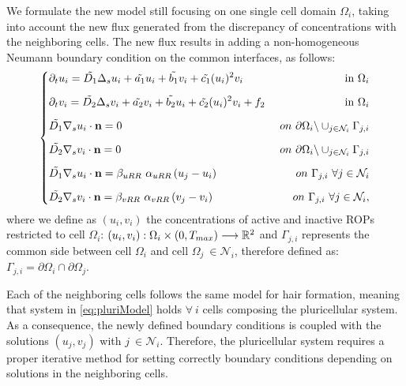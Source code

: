 \documentclass[a4paper]{siamart190516}
\begin{document}
We formulate the new model still focusing on one single cell domain $\Omega_i$, taking into account the new flux generated from the discrepancy of concentrations with the neighboring cells. The new flux results in adding a non-homogeneous Neumann boundary condition on the common interfaces, as follows:
\begin{equation} \label{eq:pluriModel}
\left\lbrace
\begin{matrix}
  \begin{aligned}
    & \partial_t u_i = \Tilde{D_1} \Delta_s u_i + \Tilde{a_1} u_i + \Tilde{b_1} v_i + \Tilde{c_1} (u_i)^2 v_i & \ \text{in} \ \Omega_i\\[6pt]
    & \partial_t v_i = \Tilde{D_2} \Delta_s v_i + \Tilde{a_2} v_i + \Tilde{b_2} u_i + \Tilde{c_2} (u_i)^2 v_i + f_2 & \ \text{in} \ \Omega_i \\[6pt]
    & \Tilde{D_1} \nabla_s u_i \cdot \mathbf{n} = 0 & \ on \ \partial \Omega_i \backslash \cup_{j \in \mathcal{N}_i} \Gamma_{j,i} \\[6pt]
    & \Tilde{D_2} \nabla_s v_i \cdot \mathbf{n} = 0 & \ on \ \partial \Omega_i \backslash \cup_{j \in \mathcal{N}_i} \Gamma_{j,i} \\[6pt]
    & \Tilde{D_1} \nabla_s u_i \cdot \mathbf{n} = \beta_{uRR} \ \alpha_{uRR} \left(u_j - u_i \right) & \ on \ \Gamma_{j,i} \ \forall j \in  \mathcal{N}_i \\[6pt]
    & \Tilde{D_2} \nabla_s v_i \cdot \mathbf{n} = \beta_{vRR} \ \alpha_{vRR} \left(v_j - v_i \right) & \ on \ \Gamma_{j,i}\ \forall j \in  \mathcal{N}_i ,
  \end{aligned}
\end{matrix}
\right.
\end{equation}
where we define as $(u_i, v_i)$ the concentrations of active and inactive ROPs restricted to cell $\Omega_i$: $(u_i, v_i): \Omega_i \times \left(0, T_{max} \right) \longrightarrow \mathbb{R}^2$ and $\Gamma_{j,i}$ represents the common side between cell $\Omega_i$ and cell $\Omega_j \ \in \mathcal{N}_i $, therefore defined as: $\Gamma_{j,i} = \partial \Omega_i \cap \partial \Omega_j$.

Each of the neighboring cells follows the same model for hair formation, meaning that system in \eqref{eq:pluriModel} holds $\forall \ i$ cells composing the pluricellular system. As a consequence, the newly defined boundary conditions is coupled with the solutions $(u_j, v_j)$ with $j \ \in \mathcal{N}_i$. Therefore, the pluricellular system requires a proper iterative method for setting correctly boundary conditions depending on solutions in the neighboring cells.
\end{document}
